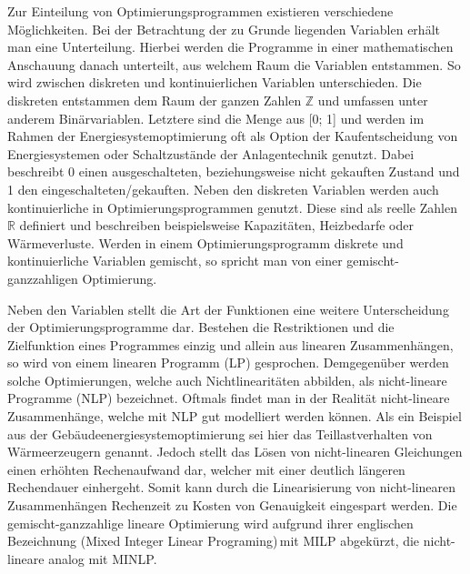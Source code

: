 Zur Einteilung von Optimierungsprogrammen existieren verschiedene Möglichkeiten.
Bei der Betrachtung der zu Grunde liegenden Variablen erhält man eine Unterteilung.
Hierbei werden die Programme in einer mathematischen Anschauung danach unterteilt, aus welchem Raum die Variablen entstammen.
So wird zwischen diskreten und kontinuierlichen Variablen unterschieden. 
Die diskreten entstammen dem Raum der ganzen Zahlen \(\mathbb{Z}\) und umfassen unter anderem Binärvariablen.
Letztere sind die Menge aus [0; 1] und werden im Rahmen der Energiesystemoptimierung oft als Option der Kaufentscheidung von Energiesystemen oder Schaltzustände der Anlagentechnik genutzt. 
Dabei beschreibt 0 einen ausgeschalteten, beziehungsweise nicht gekauften Zustand und 1 den eingeschalteten/gekauften.
Neben den diskreten Variablen werden auch kontinuierliche in Optimierungsprogrammen genutzt. 
Diese sind als reelle Zahlen \(\mathbb{R}\) definiert und beschreiben beispielsweise Kapazitäten, Heizbedarfe oder Wärmeverluste.
Werden in einem Optimierungsprogramm diskrete und kontinuierliche Variablen gemischt, so spricht man von einer gemischt-ganzzahligen Optimierung. \cite{Schellong.2016}

Neben den Variablen stellt die Art der Funktionen eine weitere Unterscheidung der Optimierungsprogramme dar.
Bestehen die Restriktionen und die Zielfunktion eines Programmes einzig und allein aus linearen Zusammenhängen, so wird von einem linearen Programm (LP) gesprochen.
Demgegenüber werden solche Optimierungen, welche auch Nichtlinearitäten abbilden, als nicht-lineare Programme (NLP) bezeichnet.
Oftmals findet man in der Realität nicht-lineare Zusammenhänge, welche mit NLP gut modelliert werden können.
Als ein Beispiel aus der Gebäudeenergiesystemoptimierung sei hier das Teillastverhalten von Wärmeerzeugern genannt.
Jedoch stellt das Lösen von nicht-linearen Gleichungen einen erhöhten Rechenaufwand dar, welcher mit einer deutlich längeren Rechendauer einhergeht.
Somit kann durch die Linearisierung von nicht-linearen Zusammenhängen Rechenzeit zu Kosten von Genauigkeit eingespart werden. 
Die gemischt-ganzzahlige lineare Optimierung wird aufgrund ihrer englischen Bezeichnung (\glqq Mixed Integer Linear Programing\grqq)\,mit MILP abgekürzt, die nicht-lineare analog mit MINLP. \cite{Samsatli.2018} 

